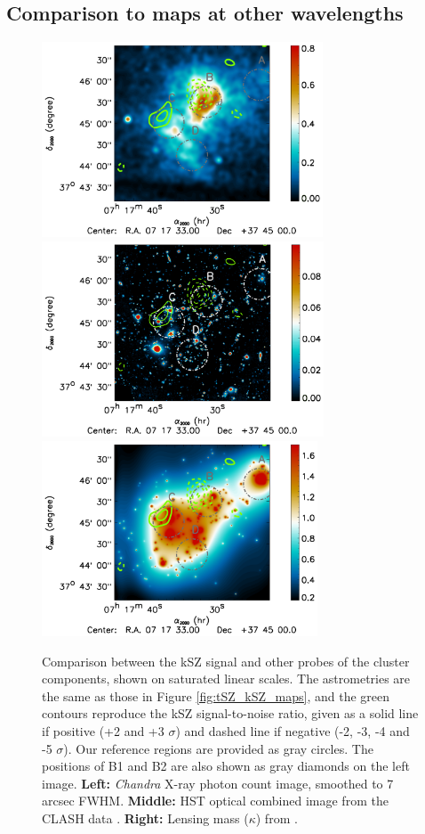 \documentclass[twocolumn,traditabstract]{aa}
\begin{document}
\subsection{Comparison to maps at other wavelengths}\label{sec:Qualitative_comparison_to_other_wavelengths}
\begin{figure}[h]
\centering
\includegraphics[trim=4.6cm 2.3cm 3cm 0cm, clip=true,height=5.8cm]{Figure/MACSJ0717_multiL2.pdf}
\includegraphics[trim=4.6cm 2.3cm 3cm 0cm, clip=true,height=5.8cm]{Figure/MACSJ0717_multiL3.pdf}
\includegraphics[trim=4.6cm 2.3cm 3cm 0cm, clip=true,height=5.8cm]{Figure/MACSJ0717_multiL1.pdf}
\caption{\footnotesize{Comparison between the kSZ signal and other probes of the cluster components, shown on saturated linear scales. The astrometries are the same as those in Figure \ref{fig:tSZ_kSZ_maps}, and the green contours reproduce the kSZ signal-to-noise ratio, given as a solid line if positive (+2 and +3 $\sigma$) and dashed line if negative (-2, -3, -4 and -5 $\sigma$). Our reference regions are provided as gray circles. The positions of B1 and B2 are also shown as gray diamonds on the left image. {\bf Left:} \textit{Chandra} X-ray photon count image, smoothed to 7 arcsec FWHM. {\bf Middle:} HST optical combined image from the CLASH data \citep{Postman2012}. {\bf Right:} Lensing mass ($\kappa$) from \cite{Zitrin2011}.}}
\label{fig:tSZ_kSZ_multiL}
\end{figure}
\end{document}
